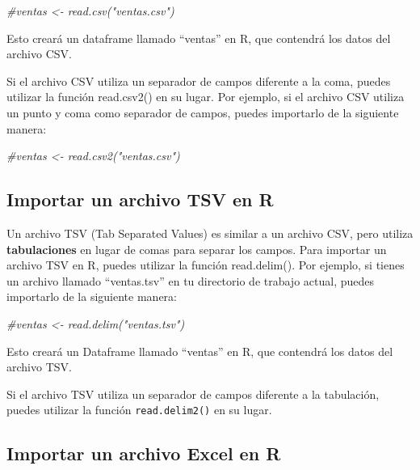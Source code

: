\documentclass[
]{book}
\newenvironment{Shaded}{\begin{snugshade}}{\end{snugshade}}
\newcommand{\CommentTok}[1]{\textcolor[rgb]{0.56,0.35,0.01}{\textit{#1}}}
\begin{document}
\begin{Shaded}
\begin{Highlighting}[]
\CommentTok{\#ventas \textless{}{-} read.csv("ventas.csv")}
\end{Highlighting}
\end{Shaded}

Esto creará un dataframe llamado ``ventas'' en R, que contendrá los datos del archivo CSV.

Si el archivo CSV utiliza un separador de campos diferente a la coma, puedes utilizar la función read.csv2() en su lugar. Por ejemplo, si el archivo CSV utiliza un punto y coma como separador de campos, puedes importarlo de la siguiente manera:

\begin{Shaded}
\begin{Highlighting}[]
\CommentTok{\#ventas \textless{}{-} read.csv2("ventas.csv")}
\end{Highlighting}
\end{Shaded}

\subsection{Importar un archivo TSV en R}\label{importar-un-archivo-tsv-en-r}

Un archivo TSV (Tab Separated Values) es similar a un archivo CSV, pero utiliza \textbf{tabulaciones} en lugar de comas para separar los campos. Para importar un archivo TSV en R, puedes utilizar la función read.delim(). Por ejemplo, si tienes un archivo llamado ``ventas.tsv'' en tu directorio de trabajo actual, puedes importarlo de la siguiente manera:

\begin{Shaded}
\begin{Highlighting}[]
\CommentTok{\#ventas \textless{}{-} read.delim("ventas.tsv")}
\end{Highlighting}
\end{Shaded}

Esto creará un Dataframe llamado ``ventas'' en R, que contendrá los datos del archivo TSV.

Si el archivo TSV utiliza un separador de campos diferente a la tabulación, puedes utilizar la función \texttt{read.delim2()} en su lugar.

\subsection{Importar un archivo Excel en R}\label{importar-un-archivo-excel-en-r}
\end{document}
